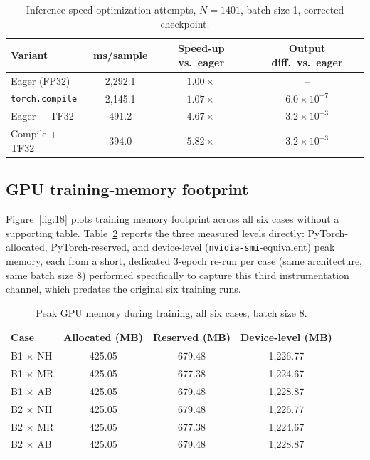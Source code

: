\documentclass[final,5p,times]{elsarticle}
\begin{document}
\begin{table}[ht]
\centering
\caption{Inference-speed optimization attempts, $N{=}1401$, batch size 1,
  corrected checkpoint.}
\label{tab:a3}
\small
\begin{tabular}{lccc}
\toprule
Variant & ms/sample & Speed-up vs.\ eager & Output diff.\ vs.\ eager \\
\midrule
Eager (FP32)      & 2{,}292.1 & $1.00\times$ & -- \\
\texttt{torch.compile}        & 2{,}145.1 & $1.07\times$ & $6.0\times10^{-7}$ \\
Eager + TF32      & 491.2     & $4.67\times$ & $3.2\times10^{-3}$ \\
Compile + TF32    & 394.0     & $5.82\times$ & $3.2\times10^{-3}$ \\
\bottomrule
\end{tabular}
\end{table}

\subsection{GPU training-memory footprint}
Figure~\ref{fig:18} plots training memory footprint across all six cases
without a supporting table. Table~\ref{tab:a4} reports the three
measured levels directly: PyTorch-allocated, PyTorch-reserved, and
device-level (\texttt{nvidia-smi}-equivalent) peak memory, each from a
short, dedicated 3-epoch re-run per case (same architecture, same batch
size 8) performed specifically to capture this third instrumentation
channel, which predates the original six training runs.

\begin{table}[ht]
\centering
\caption{Peak GPU memory during training, all six cases, batch size 8.}
\label{tab:a4}
\small
\begin{tabular}{lccc}
\toprule
Case & Allocated (MB) & Reserved (MB) & Device-level (MB) \\
\midrule
B1 $\times$ NH & 425.05 & 679.48 & 1{,}226.77 \\
B1 $\times$ MR & 425.05 & 677.38 & 1{,}224.67 \\
B1 $\times$ AB & 425.05 & 679.48 & 1{,}228.87 \\
B2 $\times$ NH & 425.05 & 679.48 & 1{,}226.77 \\
B2 $\times$ MR & 425.05 & 677.38 & 1{,}224.67 \\
B2 $\times$ AB & 425.05 & 679.48 & 1{,}228.87 \\
\bottomrule
\end{tabular}
\end{table}
\end{document}
